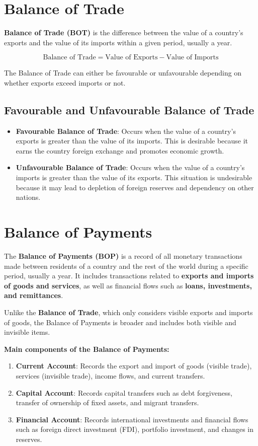 \documentclass[12pt,a4paper, openany]{book}
\begin{document}
\section{Balance of Trade}
\textbf{Balance of Trade (BOT)} is the difference between the value of a country’s exports and the value of its imports within a given period, usually a year.

\[
	\text{Balance of Trade} = \text{Value of Exports} - \text{Value of Imports}
\]

The Balance of Trade can either be favourable or unfavourable depending on whether exports exceed imports or not.

\subsection{Favourable and Unfavourable Balance of Trade}
\begin{itemize}
	\item \textbf{Favourable Balance of Trade}:
	      Occurs when the value of a country’s exports is greater than the value of its imports. This is desirable because it earns the country foreign exchange and promotes economic growth.

	\item \textbf{Unfavourable Balance of Trade}:
	      Occurs when the value of a country’s imports is greater than the value of its exports. This situation is undesirable because it may lead to depletion of foreign reserves and dependency on other nations.
\end{itemize}

\section{Balance of Payments}
The \textbf{Balance of Payments (BOP)} is a record of all monetary transactions made between residents of a country and the rest of the world during a specific period, usually a year.
It includes transactions related to \textbf{exports and imports of goods and services}, as well as financial flows such as \textbf{loans, investments, and remittances}.

Unlike the \textbf{Balance of Trade}, which only considers visible exports and imports of goods, the Balance of Payments is broader and includes both visible and invisible items.

\textbf{Main components of the Balance of Payments:}
\begin{enumerate}
	\item \textbf{Current Account}:
	      Records the export and import of goods (visible trade), services (invisible trade), income flows, and current transfers.

	\item \textbf{Capital Account}:
	      Records capital transfers such as debt forgiveness, transfer of ownership of fixed assets, and migrant transfers.

	\item \textbf{Financial Account}:
	      Records international investments and financial flows such as foreign direct investment (FDI), portfolio investment, and changes in reserves.
\end{enumerate}
\end{document}
